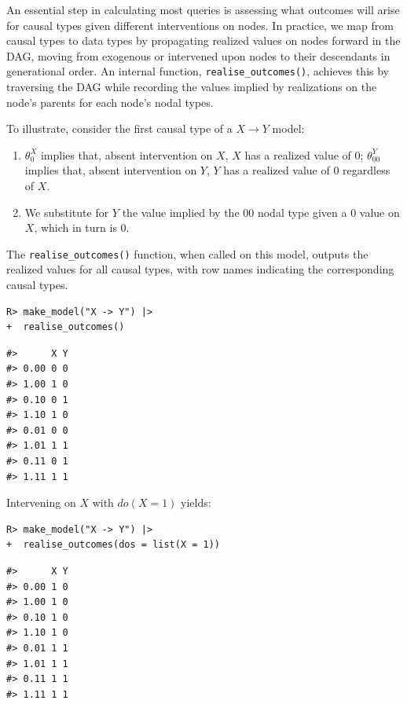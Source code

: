 \documentclass[
  11pt,
  article]{jss}
\providecommand{\tightlist}{%
  \setlength{\itemsep}{0pt}\setlength{\parskip}{0pt}}\usepackage{longtable,booktabs,array}
\begin{document}
An essential step in calculating most queries is assessing what outcomes
will arise for causal types given different interventions on nodes. In
practice, we map from causal types to data types by propagating realized
values on nodes forward in the DAG, moving from exogenous or intervened
upon nodes to their descendants in generational order. An internal
function, \texttt{realise\_outcomes()}, achieves this by traversing the
DAG while recording the values implied by realizations on the node's
parents for each node's nodal types.

To illustrate, consider the first causal type of a \(X \rightarrow Y\)
model:

\begin{enumerate}
\def\labelenumi{\arabic{enumi}.}
\tightlist
\item
  \(\theta^X_0\) implies that, absent intervention on \(X\), \(X\) has a
  realized value of \(0\); \(\theta^Y_{00}\) implies that, absent
  intervention on \(Y\), \(Y\) has a realized value of \(0\) regardless
  of \(X\).
\item
  We substitute for \(Y\) the value implied by the \(00\) nodal type
  given a \(0\) value on \(X\), which in turn is \(0\).
\end{enumerate}

The \texttt{realise\_outcomes()} function, when called on this model,
outputs the realized values for all causal types, with row names
indicating the corresponding causal types.

\begin{verbatim}
R> make_model("X -> Y") |> 
+  realise_outcomes()
\end{verbatim}

\begin{verbatim}
#>      X Y
#> 0.00 0 0
#> 1.00 1 0
#> 0.10 0 1
#> 1.10 1 0
#> 0.01 0 0
#> 1.01 1 1
#> 0.11 0 1
#> 1.11 1 1
\end{verbatim}

Intervening on \(X\) \citep[see][]{pearl_causality_2009} with
\(do(X=1)\) yields:

\begin{verbatim}
R> make_model("X -> Y") |> 
+  realise_outcomes(dos = list(X = 1))
\end{verbatim}

\begin{verbatim}
#>      X Y
#> 0.00 1 0
#> 1.00 1 0
#> 0.10 1 0
#> 1.10 1 0
#> 0.01 1 1
#> 1.01 1 1
#> 0.11 1 1
#> 1.11 1 1
\end{verbatim}
\end{document}
